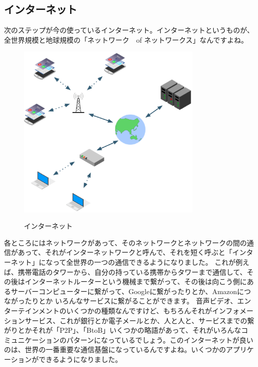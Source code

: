 \subsection{インターネット}
次のステップが今の使っているインターネット。インターネットというものが、全世界規模と地球規模の「ネットワーク　of ネットワークス」なんですよね。
\begin{figure}[H]
    \includegraphics[width=0.8\textwidth]{lesson1/internet.eps}
    \label{fig: 1}
    \caption{インターネット}
\end{figure}
各ところにはネットワークがあって、そのネットワークとネットワークの間の通信があって、それがインターネットワークと呼んで、それを短く呼ぶと「インターネット」になって全世界の一つの通信できるようになりました。
これが例えば、携帯電話のタワーから、自分の持っている携帯からタワーまで通信して、その後はインターネットルーターという機械まで繋がって、その後は向こう側にあるサーバーコンピューターに繋がって、Googleに繋がったりとか、Amazonにつながったりとか
いろんなサービスに繋がることができます。
音声ビデオ、エンターテインメントのいくつかの種類なんですけど、もちろんそれがインフォメーションサービス、これが銀行とか電子メールとか、人と人と、サービスまでの繋がりとかそれが「P2P」、「BtoB」いくつかの略語があって、それがいろんなコミュニケーションのパターンになっているでしょう。このインターネットが良いのは、世界の一番重要な通信基盤になっているんですよね。いくつかのアプリケーションができるようになりました。
